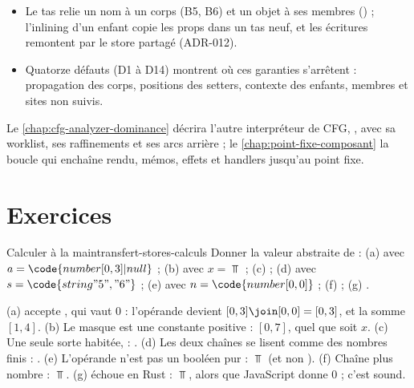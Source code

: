 \begin{resume}
\begin{itemize}
    (, , , ) ;
    seuls les  sont exécutés, par un second interpréteur de CFG
    en une passe, jusqu'à la profondeur 3.  non descendu est un
    FN accepté (ADR-009).
  \item Le tas relie un nom à un corps (B5, B6) et un objet à ses membres
    () ; l'inlining d'un enfant copie les props dans un tas neuf, et
    les écritures remontent par le store partagé (ADR-012).
  \item Quatorze défauts (D1 à D14) montrent où ces garanties s'arrêtent :
    propagation des corps, positions des setters, contexte des enfants,
    membres et sites non suivis.
\end{itemize}
Le \cref{chap:cfg-analyzer-dominance} décrira l'autre interpréteur de CFG,
, avec sa worklist, ses raffinements et ses arcs arrière ;
le \cref{chap:point-fixe-composant} la boucle qui enchaîne rendu, mémos,
effets et handlers jusqu'au point fixe.
\end{resume}

\section*{Exercices}
\label{sec:transfert-stores-exercices}

\begin{exercice}{Calculer à la main}{transfert-stores-calculs}
  Donner la valeur abstraite de : (a)  avec
  $a = \code{number[0, 3]|null}$ ; (b)  avec $x = \Top$ ;
  (c)  ; (d)  avec $s = \code{string{"5", "6"}}$ ;
  (e)  avec $n = \code{number[0, 0]}$ ; (f)  ;
  (g) .
\end{exercice}
\begin{solution}
  (a)  accepte , qui vaut $0$ : l'opérande devient
  $[0,3] \join [0,0] = [0,3]$, et la somme $[1,4]$. (b) Le masque est une
  constante positive : $[0,7]$, quel que soit $x$. (c) Une seule sorte
  habitée,  : . (d) Les deux chaînes se
  lisent comme des nombres finis : . (e) L'opérande n'est
  pas un booléen pur : $\Top$ (et non ). (f) Chaîne plus
  nombre : $\Top$. (g)  échoue en Rust :
  $\Top$, alors que JavaScript donne $0$ ; c'est sound.
\end{solution}

